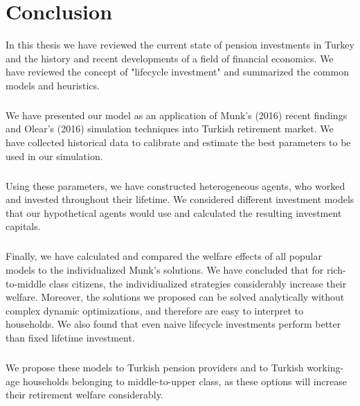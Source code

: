 \chapter{Conclusion}
\label{conclusion}

In this thesis we have reviewed the current state of pension investments in Turkey and the history and recent developments of a field of financial economics. We have reviewed the concept of "lifecycle investment" and summarized the common models and heuristics.

\paragraph{}We have presented our model as an application of Munk's (2016) recent findings and Olear's (2016) simulation techniques into Turkish retirement market. We have collected historical data to calibrate and estimate the best parameters to be used in our simulation.

\paragraph{}Using these parameters, we have constructed heterogeneous agents, who worked and invested throughout their lifetime. We considered different investment models that our hypothetical agents would use and calculated the resulting investment capitals.

\paragraph{}Finally, we have calculated and compared the welfare effects of all popular models to the individualized Munk's solutions. We have concluded that for rich-to-middle class citizens, the individiualized strategies considerably increase their welfare. Moreover, the solutions we proposed can be solved analytically without complex dynamic optimizations, and therefore are easy to interpret to households. We also found that even naive lifecycle investments perform better than fixed lifetime investment.

\paragraph{}We propose these models to Turkish pension providers and to Turkish working-age households belonging to middle-to-upper class, as these options will increase their retirement welfare considerably.
